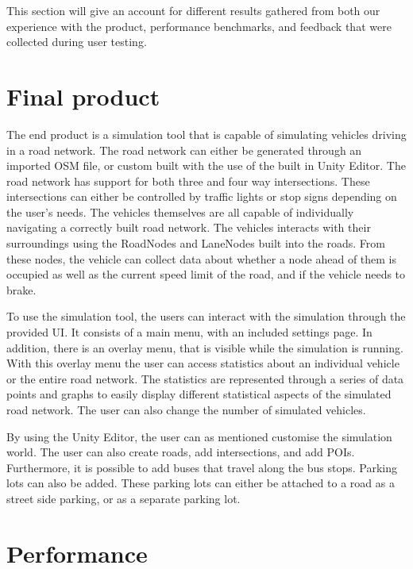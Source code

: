 
This section will give an account for different results gathered from both our experience with the product, performance benchmarks, and feedback that were collected during user testing. 

\section{Final product}
    The end product is a simulation tool that is capable of simulating vehicles driving in a road network. The road network can either be generated through an imported OSM file, or custom built with the use of the built in Unity Editor. The road network has support for both three and four way intersections. These intersections can either be controlled by traffic lights or stop signs depending on the user's needs. The vehicles themselves are all capable of individually navigating a correctly built road network. The vehicles interacts with their surroundings using the RoadNodes and LaneNodes built into the roads. From these nodes, the vehicle can collect data about whether a node ahead of them is occupied as well as the current speed limit of the road, and if the vehicle needs to brake.

    To use the simulation tool, the users can interact with the simulation through the provided UI. It consists of a main menu, with an included settings page. In addition, there is an overlay menu, that is visible while the simulation is running. With this overlay menu the user can access statistics about an individual vehicle or the entire road network. The statistics are represented through a series of data points and graphs to easily display different statistical aspects of the simulated road network. The user can also change the number of simulated vehicles.

    By using the Unity Editor, the user can as mentioned customise the simulation world. The user can also create roads, add intersections, and add POIs. Furthermore, it is possible to add buses that travel along the bus stops. Parking lots can also be added. These parking lots can either be attached to a road as a street side parking, or as a separate parking lot.

\section{Performance} \label{performance-benchmark}
    

